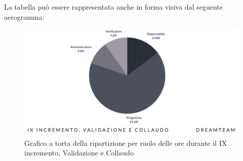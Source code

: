 La tabella può essere rappresentata anche in forma visiva dal seguente aerogramma:
\begin{figure}[H]
\centering
\includegraphics[scale=0.55]{Sezioni/SezioniPreventivo/grafici/Preventivo_torta_validazione_collaudo_IX.png}
\caption{Grafico a torta della ripartizione per ruolo delle ore durante il IX incremento, Validazione e Collaudo}
\end{figure}

\pagebreak

